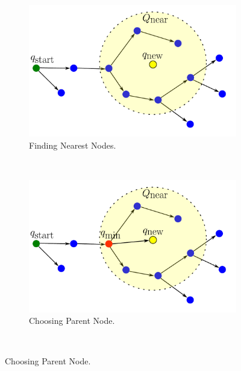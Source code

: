 \documentclass{ctuthesis}
\begin{document}
\begin{figure}[!ht]
  \centering
  \begin{subfigure}[b]{0.45\textwidth}
      \includegraphics[width=\textwidth]{figChap3/RRTstarNearNodes40pt.pdf}
      \caption{Finding Nearest Nodes.}
      \label{fig:nearest_nodes}
  \end{subfigure}
  ~ %
  \begin{subfigure}[b]{0.45\textwidth}
      \includegraphics[width=\textwidth]{figChap3/RRTstarChooseParent40pt.pdf}
      \caption{Choosing Parent Node.}
      \label{fig:choose_parent}
  \end{subfigure}
  ~ %

\end{figure}
\end{document}

